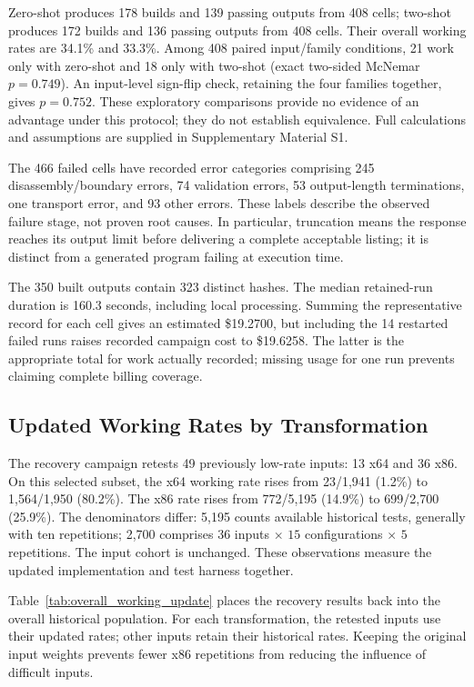 Zero-shot produces 178 builds and 139 passing outputs from 408 cells;
two-shot produces 172 builds and 136 passing outputs from 408 cells.
Their overall working rates are 34.1\% and 33.3\%. Among 408 paired
input/family conditions, 21 work only with zero-shot and 18 only with
two-shot (exact two-sided McNemar $p=0.749$). An input-level sign-flip
check, retaining the four families together, gives $p=0.752$. These
exploratory comparisons provide no evidence of an advantage under this
protocol; they do not establish equivalence. Full calculations and
assumptions are supplied in Supplementary Material S1.

The 466 failed cells have recorded error categories comprising 245
disassembly/boundary errors, 74 validation errors, 53 output-length
terminations, one transport error, and 93 other errors. These labels
describe the observed failure stage, not proven root causes. In particular,
truncation means the response reaches its output limit before delivering
a complete acceptable listing; it is distinct from a generated program
failing at execution time.

The 350 built outputs contain 323 distinct hashes. The median retained-run duration is
160.3 seconds, including local processing. Summing the representative
record for each cell gives an estimated \$19.2700, but including the
14 restarted failed runs raises recorded campaign cost to
\$19.6258. The latter is the appropriate total for work actually recorded;
missing usage for one run prevents claiming complete billing coverage.

\subsection{Updated Working Rates by Transformation}
\label{sec:recovery}
The recovery campaign retests 49 previously low-rate inputs: 13 x64 and
36 x86. On this selected subset, the x64 working rate rises from
23/1,941 (1.2\%) to 1,564/1,950 (80.2\%). The x86 rate rises from
772/5,195 (14.9\%) to 699/2,700 (25.9\%). The denominators differ:
5,195 counts available historical tests, generally with ten repetitions;
2,700 comprises $36$ inputs $\times$ $15$ configurations $\times$ $5$
repetitions. The input cohort is unchanged. These observations measure
the updated implementation and test harness together.

Table~\ref{tab:overall_working_update} places the recovery results back
into the overall historical population. For each transformation, the
retested inputs use their updated rates; other inputs retain their
historical rates. Keeping the original input weights prevents fewer x86
repetitions from reducing the influence of difficult inputs.

